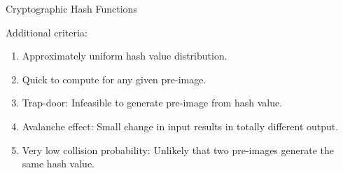 \documentclass[]{beamer}
\begin{document}
\begin{frame}{Cryptographic Hash Functions}

Additional criteria:
	\begin{enumerate}
		\item Approximately uniform hash value distribution.
		\item Quick to compute for any given pre-image.
		\item Trap-door: Infeasible to generate pre-image from hash value.
		\item Avalanche effect: Small change in input results in totally different output.
		\item Very low collision probability: Unlikely that two pre-images generate the same hash value.
	\end{enumerate}
	\vspace{1em}

	
\end{frame}
\end{document}
